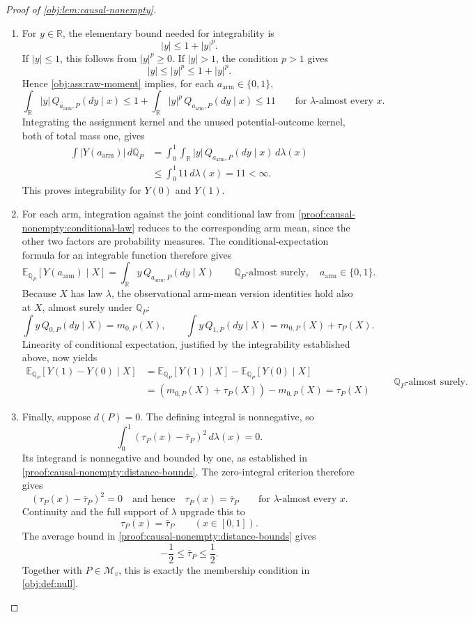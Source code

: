 \begin{proof}[Proof of \cref{obj:lem:causal-nonempty}]
\begin{enumerate}
\item For \(y\in\mathbb R\), the elementary bound needed for integrability is
\[
|y|\le1+|y|^p.
\]
If \(|y|\le1\), this follows from \(|y|^p\ge0\). If \(|y|>1\), the condition \(p>1\) gives
\[
|y|\le|y|^p\le1+|y|^p.
\]
Hence \cref{obj:ass:raw-moment} implies, for each
\(a_{\mathrm{arm}}\in\{0,1\}\),
\[
\int_{\mathbb R}|y|\,Q_{a_{\mathrm{arm}},P}(dy\mid x)
\le1+\int_{\mathbb R}|y|^p\,Q_{a_{\mathrm{arm}},P}(dy\mid x)
\le11
\qquad\text{for \(\lambda\)-almost every }x.
\]
Integrating the assignment kernel and the unused potential-outcome kernel, both of total mass one, gives
\[
\begin{aligned}
\int |Y(a_{\mathrm{arm}})|\,d\mathbb Q_P
&=\int_0^1\int_{\mathbb R}
 |y|\,Q_{a_{\mathrm{arm}},P}(dy\mid x)\,d\lambda(x)\\
&\le\int_0^1 11\,d\lambda(x)=11<\infty.
\end{aligned}
\]
This proves integrability for \(Y(0)\) and \(Y(1)\).

\item For each arm, integration against the joint conditional law from \cref{proof:causal-nonempty:conditional-law} reduces to the corresponding arm mean, since the other two factors are probability measures. The conditional-expectation formula for an integrable function therefore gives
\[
\mathbb E_{\mathbb Q_P}[Y(a_{\mathrm{arm}})\mid X]
=\int_{\mathbb R}y\,Q_{a_{\mathrm{arm}},P}(dy\mid X)
\qquad\mathbb Q_P\text{-almost surely},
\quad a_{\mathrm{arm}}\in\{0,1\}.
\]
Because \(X\) has law \(\lambda\), the observational arm-mean version identities hold also at \(X\), almost surely under \(\mathbb Q_P\):
\[
\int y\,Q_{0,P}(dy\mid X)=m_{0,P}(X),
\qquad
\int y\,Q_{1,P}(dy\mid X)=m_{0,P}(X)+\tau_P(X).
\]
Linearity of conditional expectation, justified by the integrability established above, now yields
\[
\begin{aligned}
\mathbb E_{\mathbb Q_P}[Y(1)-Y(0)\mid X]
&=\mathbb E_{\mathbb Q_P}[Y(1)\mid X]
 -\mathbb E_{\mathbb Q_P}[Y(0)\mid X]\\
&=(m_{0,P}(X)+\tau_P(X))-m_{0,P}(X)
=\tau_P(X)
\end{aligned}
\qquad\mathbb Q_P\text{-almost surely}.
\]

\item Finally, suppose \(d(P)=0\). The defining integral is nonnegative, so
\[
\int_0^1(\tau_P(x)-\bar\tau_P)^2\,d\lambda(x)=0.
\]
Its integrand is nonnegative and bounded by one, as established in \cref{proof:causal-nonempty:distance-bounds}. The zero-integral criterion therefore gives
\[
(\tau_P(x)-\bar\tau_P)^2=0
\quad\text{and hence}\quad
\tau_P(x)=\bar\tau_P
\qquad\text{for \(\lambda\)-almost every }x.
\]
Continuity and the full support of \(\lambda\) upgrade this to
\[
\tau_P(x)=\bar\tau_P
\qquad(x\in[0,1]).
\]
The average bound in \cref{proof:causal-nonempty:distance-bounds} gives
\[
-\frac12\le\bar\tau_P\le\frac12.
\]
Together with \(P\in\mathcal M_v\), this is exactly the membership condition in \cref{obj:def:null}.


\end{enumerate}
\end{proof}

